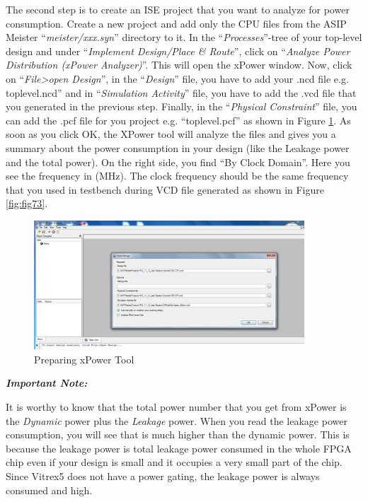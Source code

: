 The second step is to create an ISE project that you want to analyze for
power consumption. Create a new project and add only the CPU files from
the ASIP Meister ``\emph{meister/xxx.syn}'' directory to it. In the
``\emph{Processes}''-tree of your top-level design and under
``\emph{Implement Design/Place \& Route}'', click on ``\emph{Analyze
Power Distribution (xPower Analyzer)}''. This will open the xPower
window. Now, click on ``\emph{File\textgreater open Design}'', in the
``\emph{Design}'' file, you have to add your .ncd file e.g.
toplevel.ncd'' and in ``\emph{Simulation Activity}'' file, you have to
add the .vcd file that you generated in the previous step. Finally, in
the ``\emph{Physical Constraint}'' file, you can add the .pcf file for
you project e.g. ``toplevel.pcf'' as shown in Figure \ref{fig:fig72}. As soon as you click OK, the
XPower tool will analyze the files and gives you a summary about the
power consumption in your design (like the Leakage power and the total
power). On the right side, you find ``By Clock Domain''. Here you see
the frequency in (MHz). The clock frequency should be the same frequency
that you used in testbench during VCD file generated as shown in Figure \ref{fig:fig73}.
\begin{figure}[!htb]
	\centering
	\includegraphics[width=0.9\textwidth]{src/images/7-2.png}
	\caption{Preparing xPower Tool}
	\label{fig:fig72}
\end{figure}
\emph{\textbf{Important Note:}}

It is worthy to know that the total power number that you get from
xPower is the \emph{Dynamic} power plus the \emph{Leakage} power. When
you read the leakage power consumption, you will see that is much higher
than the dynamic power. This is because the leakage power is total
leakage power consumed in the whole FPGA chip even if your design is
small and it occupies a very small part of the chip. Since Vitrex5 does
not have a power gating, the leakage power is always consumed and high.

